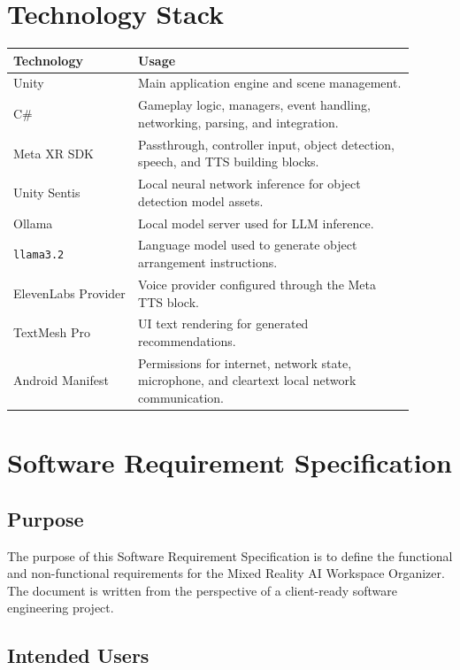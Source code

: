 \documentclass[12pt,a4paper]{article}
\begin{document}
\section{Technology Stack}

\begin{longtable}{p{0.28\linewidth} p{0.62\linewidth}}
\toprule
\textbf{Technology} & \textbf{Usage}\\
\midrule
Unity & Main application engine and scene management.\\
C\# & Gameplay logic, managers, event handling, networking, parsing, and integration.\\
Meta XR SDK & Passthrough, controller input, object detection, speech, and TTS building blocks.\\
Unity Sentis & Local neural network inference for object detection model assets.\\
Ollama & Local model server used for LLM inference.\\
\texttt{llama3.2} & Language model used to generate object arrangement instructions.\\
ElevenLabs Provider & Voice provider configured through the Meta TTS block.\\
TextMesh Pro & UI text rendering for generated recommendations.\\
Android Manifest & Permissions for internet, network state, microphone, and cleartext local network communication.\\
\bottomrule
\end{longtable}

\section{Software Requirement Specification}

\subsection{Purpose}

The purpose of this Software Requirement Specification is to define the functional and non-functional requirements for the Mixed Reality AI Workspace Organizer. The document is written from the perspective of a client-ready software engineering project.

\subsection{Intended Users}
\end{document}
